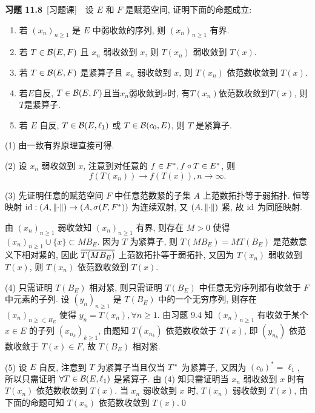 	\textbf{习题 11.8}\ [习题课]\ \ 设 $ E $ 和 $ F $ 是赋范空间, 证明下面的命题成立:
	\begin{enumerate}[(1)]
		\item 若 $ (x_{n})_{n\geqslant1} $ 是 $ E $ 中弱收敛的序列, 则 $ (x_{n})_{n\geqslant1} $ 有界.
		\item 若 $ T\in\CB(E, F) $ 且 $ x_{n} $ 弱收敛到 $ x $, 则 $ T(x_{n}) $ 弱收敛到 $ T(x) $.
		\item 若 $ T\in\CB(E, F) $ 是紧算子且 $ x_{n} $ 弱收敛到 $ x $, 则 $ T(x_{n}) $ 依范数收敛到 $ T(x) $.
		\item 若$ E $自反, $ T\in\CB(E,F) $且当$ x_n $弱收敛到$ x $时, 有$ T(x_n) $依范数收敛到$ T(x) $, 则$ T $是紧算子. 
		\item 若 $ E $ 自反, $ T\in\CB(E, \ell_{1}) $ 或 $ T\in\CB(c_{0}, E) $, 则 $ T $ 是紧算子.
	\end{enumerate}
	\begin{Proof}
		(1) 由一致有界原理直接可得.

		(2) 设 $ x_{n} $ 弱收敛到 $ x $, 注意到对任意的 $ f\in\Star{F}, f\circ T\in\Star{E} $, 则
		\[
			f(T(x_{n}))\to f(T(x)), n\to\infty.
		\]

		(3) 先证明任意的赋范空间 $ F $ 中任意范数紧的子集 $ A $ 上范数拓扑等于弱拓扑. 恒等映射 $ \id: (A, \norm{\cdot})\to (A, \sigma(F, \Star{F})) $ 为连续双射, 又 $ (A, \norm{\cdot}) $ 紧, 故 $ \id $ 为同胚映射.
		
		由 $ (x_{n})_{n\geqslant1} $ 弱收敛知 $ (x_{n})_{n\geqslant1} $ 有界, 则存在 $ M>0 $ 使得 $ (x_{n})_{n\geqslant 1}\cup\{ x \}\subset MB_{E} $. 因为 $ T $ 为紧算子, 则 $ T(MB_{E})=MT(B_{E}) $ 是范数意义下相对紧的, 因此 $ \baro{T(MB_{E})} $ 上范数拓扑等于弱拓扑, 又因为 $ T(x_{n}) $ 弱收敛到 $ T(x) $, 则 $ T(x_{n}) $ 依范数收敛到 $ T(x) $.

		(4) 只需证明 $ T(B_{E}) $ 相对紧, 则只需证明 $ T(B_{E}) $ 中任意无穷序列都有收敛于 $ F $ 中元素的子列. 设 $ (y_{n})_{n\geqslant1} $ 是 $ T(B_{E}) $ 中的一个无穷序列, 则存在 $ (x_{n})_{n\geqslant \subset B_{E}} $ 使得 $ y_{n}=T(x_{n}), \forall n\geqslant1 $. 由习题 9.4 知 $ (x_{n})_{n\geqslant1} $ 有收敛于某个 $ x\in E $ 的子列 $ (x_{n_{k}})_{k\geqslant1} $, 由题知 $ T(x_{n_{k}}) $ 依范数收敛于 $ T(x) $, 即 $ (y_{n_{k}}) $ 依范数收敛于 $ T(x)\in F $, 故 $ T(B_{E}) $ 相对紧.

		(5) 设 $ E $ 自反, 注意到 $ T $ 为紧算子当且仅当 $ \Star{T} $ 为紧算子, 又因为 $ (c_{0})^{*}=\ell_{1} $, 所以只需证明 $ \forall T\in \CB(E, \ell_{1}) $ 是紧算子. 由 (4) 知只需证明当 $ x_{n} $ 弱收敛到 $ x $ 时有 $ T(x_{n}) $ 依范数收敛到 $ T(x) $. 当 $ x_{n} $ 弱收敛到 $ x $ 时, $ T(x_{n}) $ 弱收敛到 $ T(x) $, 由下面的命题可知 $ T(x_{n}) $ 依范数收敛到 $ T(x) $.\qed
	\end{Proof}
